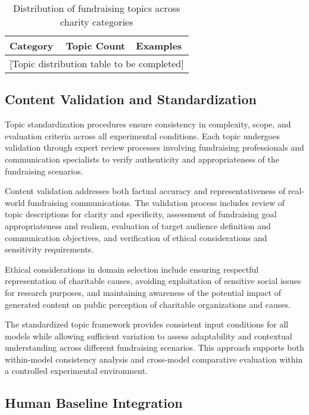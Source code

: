 \begin{table}[htbp]
    \centering
    \caption{Distribution of fundraising topics across charity categories}
    \label{tab:topic-distribution}
    \begin{tabular}{|l|c|l|}
    \hline
    \textbf{Category} & \textbf{Topic Count} & \textbf{Examples} \\
    \hline
    \multicolumn{3}{|c|}{[Topic distribution table to be completed]} \\
    \hline
    \end{tabular}
\end{table}

\subsection{Content Validation and Standardization}

Topic standardization procedures ensure consistency in complexity, scope, and evaluation criteria across all experimental conditions. Each topic undergoes validation through expert review processes involving fundraising professionals and communication specialists to verify authenticity and appropriateness of the fundraising scenarios.

Content validation addresses both factual accuracy and representativeness of real-world fundraising communications. The validation process includes review of topic descriptions for clarity and specificity, assessment of fundraising goal appropriateness and realism, evaluation of target audience definition and communication objectives, and verification of ethical considerations and sensitivity requirements.

Ethical considerations in domain selection include ensuring respectful representation of charitable causes, avoiding exploitation of sensitive social issues for research purposes, and maintaining awareness of the potential impact of generated content on public perception of charitable organizations and causes.

The standardized topic framework provides consistent input conditions for all models while allowing sufficient variation to assess adaptability and contextual understanding across different fundraising scenarios. This approach supports both within-model consistency analysis and cross-model comparative evaluation within a controlled experimental environment.

\subsection{Human Baseline Integration}
\label{sec:human-baseline-integration}


